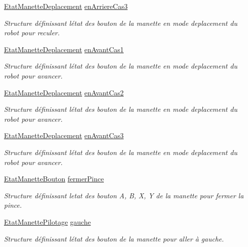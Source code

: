 \begin{DoxyCompactItemize}
\hyperlink{struct_etat_manette_deplacement}{Etat\+Manette\+Deplacement} \hyperlink{class_manette_a2dfc47df38251abd34a495005eae6572}{en\+Arriere\+Cas3}
\begin{DoxyCompactList}\small\item\em Structure définissant l\textquotesingle{}état des bouton de la manette en mode deplacement du robot pour reculer. \end{DoxyCompactList}\item 
\hyperlink{struct_etat_manette_deplacement}{Etat\+Manette\+Deplacement} \hyperlink{class_manette_ad6d8777e6a4885b343389a04174cf1c9}{en\+Avant\+Cas1}
\begin{DoxyCompactList}\small\item\em Structure définissant l\textquotesingle{}état des bouton de la manette en mode deplacement du robot pour avancer. \end{DoxyCompactList}\item 
\hyperlink{struct_etat_manette_deplacement}{Etat\+Manette\+Deplacement} \hyperlink{class_manette_a37e31078db889bbf8202b7d8cb9c5947}{en\+Avant\+Cas2}
\begin{DoxyCompactList}\small\item\em Structure définissant l\textquotesingle{}état des bouton de la manette en mode deplacement du robot pour avancer. \end{DoxyCompactList}\item 
\hyperlink{struct_etat_manette_deplacement}{Etat\+Manette\+Deplacement} \hyperlink{class_manette_a4546e6f56bac4a9e99a92539a68f3c5c}{en\+Avant\+Cas3}
\begin{DoxyCompactList}\small\item\em Structure définissant l\textquotesingle{}état des bouton de la manette en mode deplacement du robot pour avancer. \end{DoxyCompactList}\item 
\hyperlink{struct_etat_manette_bouton}{Etat\+Manette\+Bouton} \hyperlink{class_manette_a32adcccdddf35a04970b8b3b12462c00}{fermer\+Pince}
\begin{DoxyCompactList}\small\item\em Structure définissant l\textquotesingle{}etat des bouton A, B, X, Y de la manette pour fermer la pince. \end{DoxyCompactList}\item 
\hyperlink{struct_etat_manette_pilotage}{Etat\+Manette\+Pilotage} \hyperlink{class_manette_acc72f831540b93ac3a265d35d005c4fa}{gauche}
\begin{DoxyCompactList}\small\item\em Structure définissant l\textquotesingle{}état des bouton de la manette pour aller à gauche. \end{DoxyCompactList}\item 

\end{DoxyCompactItemize}
